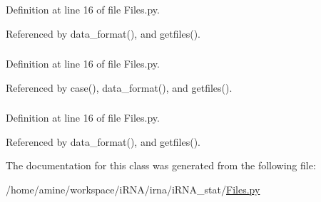 \-Definition at line 16 of file \-Files.\-py.



\-Referenced by data\-\_\-format(), and getfiles().

\hypertarget{classirna_1_1iRNA__stat_1_1Files_1_1Files_ae0745b17e9691a7c38b1ef2500277f0c}{
\subsubsection[{soft\-\_\-inf}]{}}
\label{classirna_1_1iRNA__stat_1_1Files_1_1Files_ae0745b17e9691a7c38b1ef2500277f0c}


\-Definition at line 16 of file \-Files.\-py.



\-Referenced by case(), data\-\_\-format(), and getfiles().

\hypertarget{classirna_1_1iRNA__stat_1_1Files_1_1Files_a22f6ab32da58f1d3b81180087ff4a2cc}{
\subsubsection[{thres\-\_\-inf}]{}}
\label{classirna_1_1iRNA__stat_1_1Files_1_1Files_a22f6ab32da58f1d3b81180087ff4a2cc}


\-Definition at line 16 of file \-Files.\-py.



\-Referenced by data\-\_\-format(), and getfiles().



\-The documentation for this class was generated from the following file\-:\begin{DoxyCompactItemize}
\item 
/home/amine/workspace/i\-R\-N\-A/irna/i\-R\-N\-A\-\_\-stat/\hyperlink{iRNA__stat_2Files_8py}{\-Files.\-py}\end{DoxyCompactItemize}
